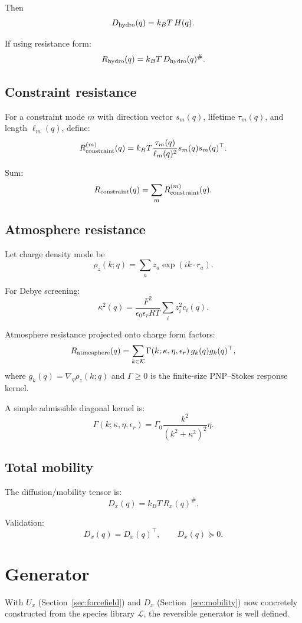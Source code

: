 \documentclass[11pt]{article}
\begin{document}
Then
\[
D_{\rm hydro}(q)=k_BT\,H(q).
\]

If using resistance form:
\[
R_{\rm hydro}(q)=k_BT\,D_{\rm hydro}(q)^\#.
\]

\subsection{Constraint resistance}

For a constraint mode \(m\) with direction vector \(s_m(q)\), lifetime
\(\tau_m(q)\), and length \(\ell_m(q)\), define:
\[
R_{\rm constraint}^{(m)}(q)
=
k_BT
\frac{\tau_m(q)}{\ell_m(q)^2}
s_m(q)s_m(q)^\top.
\]

Sum:
\[
R_{\rm constraint}(q)=\sum_m R_{\rm constraint}^{(m)}(q).
\]

\subsection{Atmosphere resistance}

Let charge density mode be
\[
\rho_z(k;q)
=
\sum_a z_a \exp(i k\cdot r_a).
\]

For Debye screening:
\[
\kappa^2(q)
=
\frac{F^2}{\epsilon_0\epsilon_r RT}
\sum_i z_i^2 c_i(q).
\]

Atmosphere resistance projected onto charge form factors:
\[
R_{\rm atmosphere}(q)
=
\sum_{k\in\mathcal K}
\Gamma(k;\kappa,\eta,\epsilon_r)
\,g_k(q)g_k(q)^\top,
\]
where \(g_k(q)=\nabla_q\rho_z(k;q)\) and \(\Gamma\ge0\) is the finite-size
PNP--Stokes response kernel.

A simple admissible diagonal kernel is:
\[
\Gamma(k;\kappa,\eta,\epsilon_r)
=
\Gamma_0
\frac{k^2}{(k^2+\kappa^2)^2}
\eta.
\]

\subsection{Total mobility}

The diffusion/mobility tensor is:
\[
D_x(q)=k_BT\,R_x(q)^\#.
\]

Validation:
\[
D_x(q)=D_x(q)^\top,\qquad D_x(q)\succeq0.
\]

\section{Generator}
\label{sec:generator}

With \(U_x\) (Section~\ref{sec:forcefield}) and \(D_x\)
(Section~\ref{sec:mobility}) now concretely constructed from the species
library \(\mathcal L\), the reversible generator is well defined.
\end{document}
